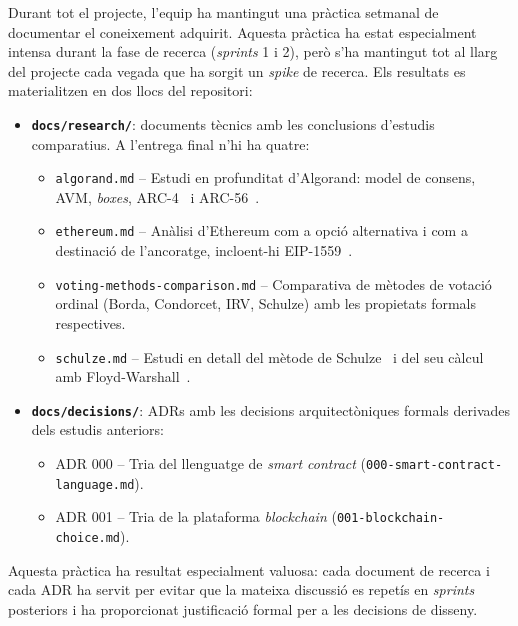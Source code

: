 Durant tot el projecte, l'equip ha mantingut una pràctica setmanal de documentar el coneixement adquirit.
Aquesta pràctica ha estat especialment intensa durant la fase de recerca (\emph{sprints} 1 i 2), però s'ha mantingut tot
al llarg del projecte cada vegada que ha sorgit un \emph{spike} de recerca.
Els resultats es materialitzen en dos llocs del repositori:

\begin{itemize}
    \item \textbf{\texttt{docs/research/}}: documents tècnics amb les conclusions d'estudis comparatius.
    A l'entrega final n'hi ha quatre:
    \begin{itemize}
        \item \texttt{algorand.md} -- Estudi en profunditat d'Algorand: model de consens, \ac{AVM}, \emph{boxes},
        \ac{ARC}-4~\cite{algorandfoundation2023arc4} i \ac{ARC}-56~\cite{algorandfoundation2023arc56}.

        \item \texttt{ethereum.md} -- Anàlisi d'Ethereum com a opció alternativa i com a destinació de l'ancoratge,
        incloent-hi \ac{EIP}-1559~\cite{eip1559}.

        \item \texttt{voting-methods-comparison.md} -- Comparativa de mètodes de votació ordinal (Borda, Condorcet, IRV,
        Schulze) amb les propietats formals respectives.

        \item \texttt{schulze.md} -- Estudi en detall del mètode de Schulze~\cite{schulze2011newmethod} i del seu càlcul
        amb Floyd-Warshall~\cite{floyd1962algorithm}.
    \end{itemize}

    \item \textbf{\texttt{docs/decisions/}}: \aclp{ADR} amb les decisions arquitectòniques formals derivades dels
    estudis anteriors:
    \begin{itemize}
        \item \ac{ADR} 000 -- Tria del llenguatge de \emph{smart contract} (\texttt{000-smart-contract-language.md}).

        \item \ac{ADR} 001 -- Tria de la plataforma \emph{blockchain} (\texttt{001-blockchain-choice.md}).
    \end{itemize}
\end{itemize}

Aquesta pràctica ha resultat especialment valuosa: cada document de recerca i cada \ac{ADR} ha servit per evitar que la
mateixa discussió es repetís en \emph{sprints} posteriors i ha proporcionat justificació formal per a les decisions de
disseny.

